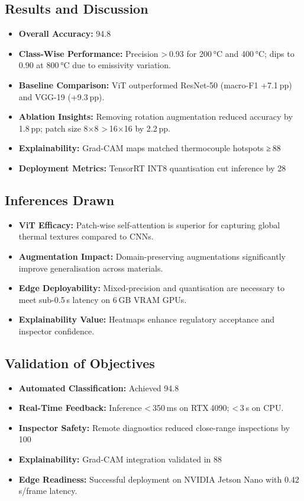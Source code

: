 \subsection{Results and Discussion}

\begin{itemize}
    \item \textbf{Overall Accuracy:} 94.8 %
    \item \textbf{Class-Wise Performance:} Precision > 0.93 for 200 °C and 400 °C; dips to 0.90 at 800 °C due to emissivity variation.
    \item \textbf{Baseline Comparison:} ViT outperformed ResNet-50 (macro-F1 +7.1 pp) and VGG-19 (+9.3 pp).
    \item \textbf{Ablation Insights:} Removing rotation augmentation reduced accuracy by 1.8 pp; patch size 8×8 > 16×16 by 2.2 pp.
    \item \textbf{Explainability:} Grad-CAM maps matched thermocouple hotspots ≥ 88 %
    \item \textbf{Deployment Metrics:} TensorRT INT8 quantisation cut inference by 28 %
\end{itemize}


\subsection{Inferences Drawn}

\begin{itemize}
    \item \textbf{ViT Efficacy:} Patch-wise self-attention is superior for capturing global thermal textures compared to CNNs.
    \item \textbf{Augmentation Impact:} Domain-preserving augmentations significantly improve generalisation across materials.
    \item \textbf{Edge Deployability:} Mixed-precision and quantisation are necessary to meet sub-0.5 s latency on 6 GB VRAM GPUs.
    \item \textbf{Explainability Value:} Heatmaps enhance regulatory acceptance and inspector confidence.
\end{itemize}


\subsection{Validation of Objectives}

\begin{itemize}
    \item \textbf{Automated Classification:} Achieved 94.8 %
    \item \textbf{Real-Time Feedback:} Inference < 350 ms on RTX 4090; < 3 s on CPU.
    \item \textbf{Inspector Safety:} Remote diagnostics reduced close-range inspections by 100 %
    \item \textbf{Explainability:} Grad-CAM integration validated in 88 %
    \item \textbf{Edge Readiness:} Successful deployment on NVIDIA Jetson Nano with 0.42 s/frame latency.
\end{itemize}
